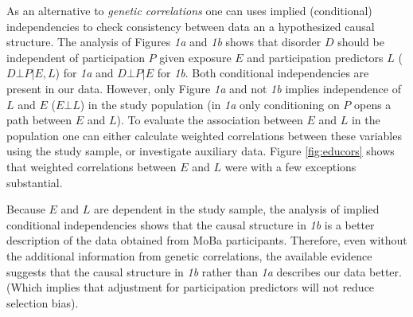 \documentclass[12pt]{article}
\begin{document}
As an alternative to \emph{genetic correlations} one can uses implied (conditional) independencies to check consistency between data an a hypothesized causal structure. The analysis of Figures \emph{1a} and \emph{1b} shows that disorder $D$ should be independent of participation $P$ given exposure $E$ and participation predictors $L$ ($D \bot P|E,L$) for \emph{1a} and $D \bot P | E$ for \emph{1b}. Both conditional independencies are present in our data. However, only Figure \emph{1a} and not \emph{1b} implies independence of $L$ and $E$ ($E \bot L$) in the study population (in \emph{1a} only conditioning on $P$ opens a path between $E$ and $L$). To evaluate the association between $E$ and $L$ in the population one can either calculate weighted correlations between these variables using the study sample, or investigate auxiliary data. Figure \ref{fig:educors} shows that weighted correlations between $E$ and $L$ were with a few exceptions substantial. 

Because $E$ and $L$ are dependent in the study sample, the analysis of implied conditional independencies shows that the causal structure in \emph{1b} is a better description of the data obtained from MoBa participants. Therefore, even without the additional information from genetic correlations, the available evidence suggests that the causal structure in \emph{1b} rather than \emph{1a} describes our data better. (Which implies that adjustment for participation predictors will not reduce selection bias).



	


\printbibliography
\end{document}
